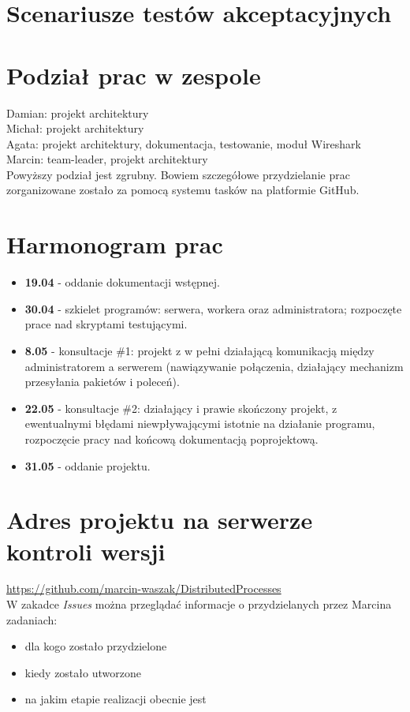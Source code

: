 \documentclass[paper=a4, fontsize=11pt]{scrartcl} %
\begin{document}
\section*{Scenariusze testów akceptacyjnych}
\section*{Podział prac w zespole}
Damian: projekt architektury \\
Michał: projekt architektury \\
Agata: projekt architektury, dokumentacja, testowanie, moduł Wireshark \\
Marcin: team-leader, projekt architektury \\

Powyższy podział jest zgrubny. Bowiem szczegółowe przydzielanie prac zorganizowane zostało za pomocą systemu tasków na platformie GitHub.

\section*{Harmonogram prac}
\begin{itemize}
\item \textbf{19.04} - oddanie dokumentacji wstępnej. 
\item \textbf{30.04} - szkielet programów: serwera, workera oraz administratora;  rozpoczęte prace nad skryptami testującymi. 
\item \textbf{8.05} - konsultacje \#1: projekt z w pełni działającą komunikacją między administratorem a serwerem (nawiązywanie połączenia, działający mechanizm przesyłania pakietów i poleceń). 
\item \textbf{22.05} - konsultacje \#2: działający i prawie skończony projekt, z ewentualnymi błędami niewpływającymi istotnie na działanie programu, rozpoczęcie pracy nad końcową dokumentacją poprojektową. 
\item \textbf{31.05} - oddanie projektu.
\end{itemize}

\section*{Adres projektu na serwerze kontroli wersji}
\url{https://github.com/marcin-waszak/DistributedProcesses}  \\

W zakadce \textit{Issues} można przeglądać informacje o przydzielanych przez Marcina zadaniach: 
\begin{itemize}
\item dla kogo zostało przydzielone
\item kiedy zostało utworzone
\item na jakim etapie realizacji obecnie jest
\end{itemize}
\end{document}
